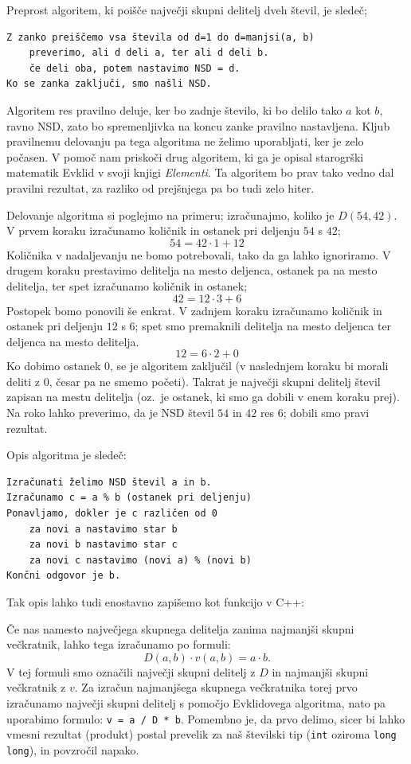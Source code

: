 Preprost algoritem, ki poišče največji skupni delitelj dveh števil, je sledeč;
\begin{verbatim}
Z zanko preiščemo vsa števila od d=1 do d=manjsi(a, b)
    preverimo, ali d deli a, ter ali d deli b.
    če deli oba, potem nastavimo NSD = d.
Ko se zanka zaključi, smo našli NSD.
\end{verbatim}
Algoritem res pravilno deluje, ker bo zadnje število, ki bo delilo tako $a$ kot
$b$, ravno NSD, zato bo spremenljivka na koncu zanke pravilno nastavljena.
Kljub pravilnemu delovanju pa tega algoritma ne želimo uporabljati, ker je zelo
počasen.
V pomoč nam priskoči drug algoritem, ki ga je opisal starogrški matematik Evklid
v svoji knjigi \emph{Elementi}.
Ta algoritem bo prav tako vedno dal pravilni rezultat, za razliko od prejšnjega
pa bo tudi zelo hiter.
\begin{examples}
  Delovanje algoritma si poglejmo na primeru; izračunajmo, koliko je $D(54,
  42)$.
  V prvem koraku izračunamo količnik in ostanek pri deljenju $54$ s $42$;
  \[
	54 = 42 \cdot 1 + 12
  \]
  Količnika v nadaljevanju ne bomo potrebovali, tako da ga lahko ignoriramo.
  V drugem koraku prestavimo delitelja na mesto deljenca, ostanek pa na mesto
  delitelja, ter spet izračunamo količnik in ostanek;
  \[
	42 = 12 \cdot 3 + 6
  \]
  Postopek bomo ponovili še enkrat.
  V zadnjem koraku izračunamo količnik in ostanek pri deljenju $12$ s $6$; spet
  smo premaknili delitelja na mesto deljenca ter deljenca na mesto delitelja.
  \[
	12 = 6 \cdot 2 + 0
  \]
  Ko dobimo ostanek $0$, se je algoritem zaključil (v naslednjem koraku bi
  morali deliti z $0$, česar pa ne smemo početi).
  Takrat je največji skupni delitelj števil zapisan na mestu delitelja
  (oz.~je ostanek, ki smo ga dobili v enem koraku prej).
  Na roko lahko preverimo, da je NSD števil $54$ in $42$ res $6$; dobili smo
  pravi rezultat.
\end{examples}

Opis algoritma je sledeč:
\begin{verbatim}
Izračunati želimo NSD števil a in b.
Izračunamo c = a % b (ostanek pri deljenju)
Ponavljamo, dokler je c različen od 0
    za novi a nastavimo star b
    za novi b nastavimo star c
    za novi c nastavimo (novi a) % (novi b)
Končni odgovor je b.
\end{verbatim}
Tak opis lahko tudi enostavno zapišemo kot funkcijo v C++:

Če nas namesto največjega skupnega delitelja zanima najmanjši skupni večkratnik,
lahko tega izračunamo po formuli:
\[
  D(a, b) \cdot v(a, b) = a \cdot b.
\]
V tej formuli smo označili največji skupni delitelj z $D$ in najmanjši skupni
večkratnik z $v$.
Za izračun najmanjšega skupnega večkratnika torej prvo izračunamo največji
skupni delitelj s pomočjo Evklidovega algoritma, nato pa uporabimo formulo:
\verb+v = a / D * b+.
Pomembno je, da prvo delimo, sicer bi lahko vmesni rezultat (produkt) postal
prevelik za naš številski tip (\verb+int+ oziroma \verb+long long+), in
povzročil napako.

